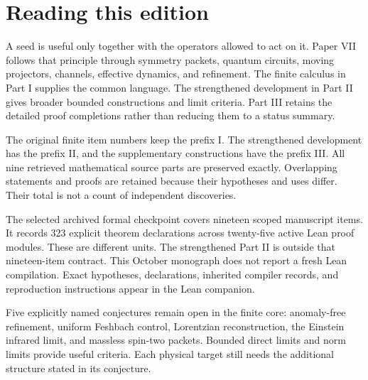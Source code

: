 \documentclass[11pt,letterpaper]{article}
\theoremstyle{definition}
\theoremstyle{remark}
\begin{document}
\KomorebiCover
{}

\section*{Reading this edition}
A seed is useful only together with the operators allowed to act on it. Paper VII follows that principle through symmetry packets, quantum circuits, moving projectors, channels, effective dynamics, and refinement. The finite calculus in Part I supplies the common language. The strengthened development in Part II gives broader bounded constructions and limit criteria. Part III retains the detailed proof completions rather than reducing them to a status summary.

The original finite item numbers keep the prefix I. The strengthened development has the prefix II, and the supplementary constructions have the prefix III. All nine retrieved mathematical source parts are preserved exactly. Overlapping statements and proofs are retained because their hypotheses and uses differ. Their total is not a count of independent discoveries.

The selected archived formal checkpoint covers nineteen scoped manuscript items. It records 323 explicit theorem declarations across twenty-five active Lean proof modules. These are different units. The strengthened Part II is outside that nineteen-item contract. This October monograph does not report a fresh Lean compilation. Exact hypotheses, declarations, inherited compiler records, and reproduction instructions appear in the Lean companion.

Five explicitly named conjectures remain open in the finite core: anomaly-free refinement, uniform Feshbach control, Lorentzian reconstruction, the Einstein infrared limit, and massless spin-two packets. Bounded direct limits and norm limits provide useful criteria. Each physical target still needs the additional structure stated in its conjecture.
\end{document}
